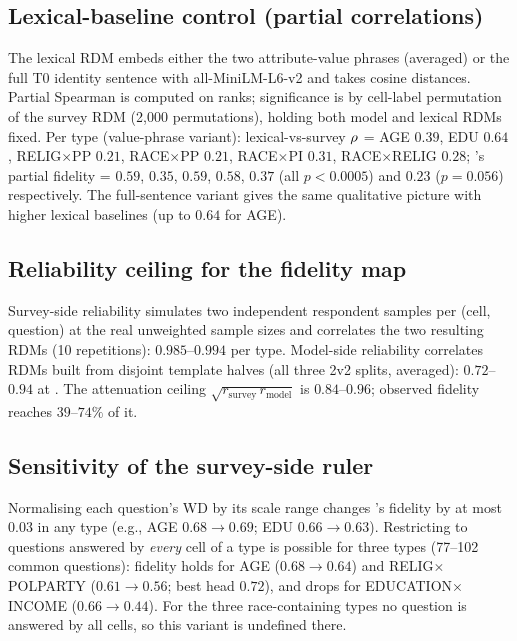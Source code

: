 \subsection{Lexical-baseline control (partial correlations)}
\label{app:lexical}
The lexical RDM embeds either the two attribute-value phrases (averaged)
or the full T0 identity sentence with all-MiniLM-L6-v2 \citep{minilm2020}
and takes cosine distances. Partial Spearman is computed on ranks;
significance is by cell-label permutation of the survey RDM (2{,}000
permutations), holding both model and lexical RDMs fixed. Per type
(value-phrase variant): lexical-vs-survey $\rho$ = AGE $0.39$, EDU
$0.64$, RELIG$\times$PP $0.21$, RACE$\times$PP $0.21$, RACE$\times$PI
$0.31$, RACE$\times$RELIG $0.28$; \starhead's partial fidelity = $0.59$,
$0.35$, $0.59$, $0.58$, $0.37$ (all $p<0.0005$) and $0.23$ ($p=0.056$)
respectively. The full-sentence variant gives the same qualitative
picture with higher lexical baselines (up to $0.64$ for AGE).

\subsection{Reliability ceiling for the fidelity map}
\label{app:reliability}
Survey-side reliability simulates two independent respondent samples per
(cell, question) at the real unweighted sample sizes and correlates the
two resulting RDMs (10 repetitions): $0.985$--$0.994$ per type.
Model-side reliability correlates RDMs built from disjoint template
halves (all three 2v2 splits, averaged): $0.72$--$0.94$ at \starhead.
The attenuation ceiling $\sqrt{r_{\text{survey}}\, r_{\text{model}}}$ is
$0.84$--$0.96$; observed fidelity reaches $39$--$74\%$ of it.

\subsection{Sensitivity of the survey-side ruler}
\label{app:dreal-sens}
Normalising each question's WD by its scale range changes \starhead's
fidelity by at most $0.03$ in any type (e.g., AGE $0.68\to0.69$; EDU
$0.66\to0.63$). Restricting to questions answered by \emph{every} cell of
a type is possible for three types (77--102 common questions): fidelity
holds for AGE ($0.68\to0.64$) and RELIG$\times$POLPARTY ($0.61\to0.56$;
best head $0.72$), and drops for EDUCATION$\times$INCOME
($0.66\to0.44$). For the three race-containing types no question is
answered by all cells, so this variant is undefined there.

